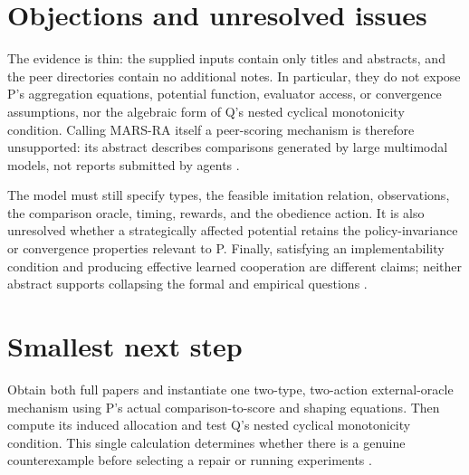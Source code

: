 \documentclass{article}
\begin{document}
\section{Objections and unresolved issues}

The evidence is thin: the supplied inputs contain only titles and abstracts, and the peer directories contain no additional notes.  In particular, they do not expose P's aggregation equations, potential function, evaluator access, or convergence assumptions, nor the algebraic form of Q's nested cyclical monotonicity condition.  Calling MARS-RA itself a peer-scoring mechanism is therefore unsupported: its abstract describes comparisons generated by large multimodal models, not reports submitted by agents .

The model must still specify types, the feasible imitation relation, observations, the comparison oracle, timing, rewards, and the obedience action.  It is also unresolved whether a strategically affected potential retains the policy-invariance or convergence properties relevant to P.  Finally, satisfying an implementability condition and producing effective learned cooperation are different claims; neither abstract supports collapsing the formal and empirical questions .

\section{Smallest next step}

Obtain both full papers and instantiate one two-type, two-action external-oracle mechanism using P's actual comparison-to-score and shaping equations.  Then compute its induced allocation and test Q's nested cyclical monotonicity condition.  This single calculation determines whether there is a genuine counterexample before selecting a repair or running experiments .
\end{document}
